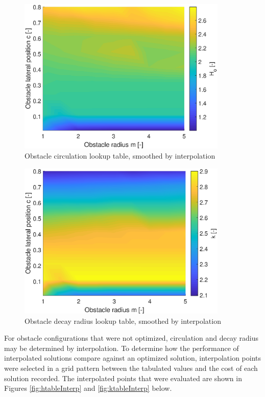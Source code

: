 \documentclass[numbered,pdftex]{ohio-etd}
\begin{document}
\begin{figure}[H]
	\centering
	\includegraphics[width=10cm]{PaperFigures/Methods/LookupTable/hTableHeat}
	\caption{Obstacle circulation lookup table, smoothed by interpolation}
	\label{fig:htableheat}
\end{figure}

\begin{figure}[H]
	\centering
	\includegraphics[width=10cm]{PaperFigures/Methods/LookupTable/kTableHeat}
	\caption{Obstacle decay radius lookup table, smoothed by interpolation}
	\label{fig:ktable}
\end{figure}

For obstacle configurations that were not optimized, circulation and decay radius may be determined by interpolation. To determine how the performance of interpolated solutions compare against an optimized solution, interpolation points were selected in a grid pattern between the tabulated values and the cost of each solution recorded. The interpolated points that were evaluated are shown in Figures \ref{fig:htableInterp} and \ref{fig:ktableInterp} below. 
\end{document}
